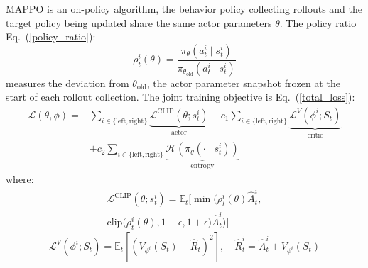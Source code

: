 \documentclass[lettersize,journal]{IEEEtran}
\begin{document}
MAPPO is an on-policy algorithm, the behavior policy collecting rollouts and the target policy being updated share the same actor parameters $\theta$. The policy ratio Eq.~(\ref{policy_ratio}):
\begin{equation}
\rho_t^i(\theta) =
\frac{\pi_{\theta}(a_t^i \mid s_t^i)}
{\pi_{\theta_{\text{old}}}(a_t^i \mid s_t^i)}
\label{policy_ratio}
\end{equation}
measures the deviation from $\theta_{\text{old}}$, the actor parameter snapshot frozen at the start of each rollout collection. The joint training objective is Eq.~(\ref{total_loss}):
\begin{equation}
\begin{aligned}
\mathcal{L}(\theta, \phi) =
& \sum_{i \in \{\text{left}, \text{right}\}}
\underbrace{\mathcal{L}^{\text{CLIP}}\left(\theta; s_t^i\right)}_{\text{actor}}
- c_1\sum_{i \in \{\text{left}, \text{right}\}}\underbrace{\mathcal{L}^{V}\left(\phi^{i}; S_t\right)}_{\text{critic}} \\
& + c_2 \sum_{i \in \{\text{left}, \text{right}\}}
\underbrace{\mathcal{H}\left(\pi_{\theta}(\cdot \mid s_t^i)\right)}_{\text{entropy}}
\end{aligned}
\label{total_loss}
\end{equation}
\noindent where:
\begin{equation}
\begin{aligned}
\mathcal{L}^{\text{CLIP}}(\theta; s_t^i) =
\mathbb{E}_t \Big[
\min \Big(
\rho_t^i(\theta)\hat{A}_t^i, \\
\mathrm{clip}\big(\rho_t^i(\theta), 1-\epsilon, 1+\epsilon\big)\hat{A}_t^i
\Big)
\Big]
\end{aligned}
\label{actor_loss}
\end{equation}
\begin{equation}
\mathcal{L}^{V}(\phi^{i}; S_t) =
\mathbb{E}_t \left[
\left( V_{\phi^{i}}(S_t) - \hat{R}_t \right)^2
\right],
\quad
\hat{R}^{i}_t = \hat{A}_t^i + V_{\phi^{i}}(S_t)
\label{critic_loss}
\end{equation}
\end{document}
